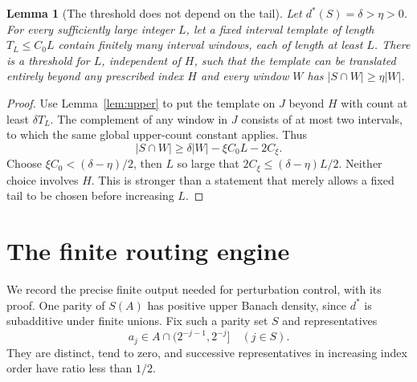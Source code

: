 \documentclass[11pt]{article}
\newtheorem{lemma}[theorem]{Lemma}
\theoremstyle{remark}\newtheorem{remark}[theorem]{Remark}
\begin{document}
\begin{lemma}[The threshold does not depend on the tail]\label{lem:flatten}
Let $d^*(S)=\delta>\eta>0$. For every sufficiently large integer $L$, let a fixed interval template of length $T_L\le C_0L$ contain finitely many interval windows, each of length at least $L$. There is a threshold for $L$, independent of $H$, such that the template can be translated entirely beyond any prescribed index $H$ and every window $W$ has $|S\cap W|\ge\eta|W|$.
\end{lemma}
\begin{proof}
Use Lemma~\ref{lem:upper} to put the template on $J$ beyond $H$ with count at least $\delta T_L$. The complement of any window in $J$ consists of at most two intervals, to which the same global upper-count constant applies. Thus
\[
 |S\cap W|\ge\delta|W|-\xi C_0 L-2C_\xi.
\]
Choose $\xi C_0<(\delta-\eta)/2$, then $L$ so large that $2C_\xi\le(\delta-\eta)L/2$. Neither choice involves $H$. This is stronger than a statement that merely allows a fixed tail to be chosen before increasing $L$.
\end{proof}

\section{The finite routing engine}\label{sec:engine}
We record the precise finite output needed for perturbation control, with its proof. One parity of $S(A)$ has positive upper Banach density, since $d^*$ is subadditive under finite unions. Fix such a parity set $S$ and representatives
\[
 a_j\in A\cap(2^{-j-1},2^{-j}]\quad(j\in S).
\]
They are distinct, tend to zero, and successive representatives in increasing index order have ratio less than $1/2$.
\end{document}
